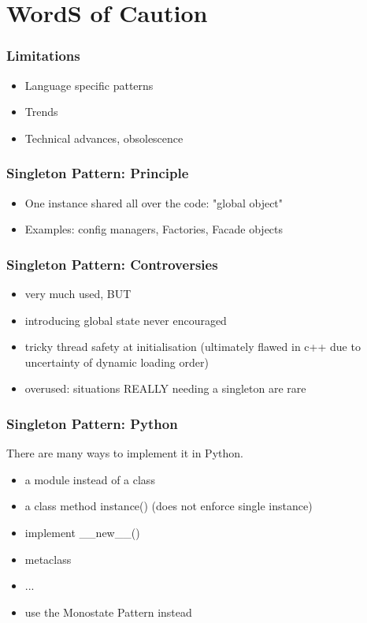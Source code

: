 \documentclass{beamer}
\begin{document}
\section{WordS of Caution}
\begin{frame}
 \frametitle{Limitations}
\begin{itemize}
 \item Language specific patterns
 \item Trends
 \item Technical advances, obsolescence
\end{itemize}
\end{frame}

\begin{frame}
\frametitle{Singleton Pattern: Principle}
\begin{itemize}
 \item One instance shared all over the code: "global object"
 \item Examples: config managers, Factories, Facade objects
\end{itemize}
\end{frame} 

\begin{frame}
\frametitle{Singleton Pattern: Controversies}
\begin{itemize}
 \item very much used, BUT
 \item introducing global state never encouraged
 \item tricky thread safety at initialisation (ultimately flawed in c++ due to uncertainty of dynamic loading order)
 \item overused: situations REALLY needing a singleton are rare
\end{itemize}
\end{frame} 

\begin{frame}
\frametitle{Singleton Pattern: Python}
There are many ways to implement it in Python.
  \begin{itemize}
   \item a module instead of a class
   \item a class method instance() (does not enforce single instance)
   \item implement \_\_new\_\_()
   \item metaclass
   \item ...
   \item use the Monostate Pattern instead
  \end{itemize}
\end{frame}
\end{document}
